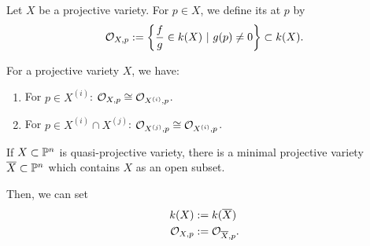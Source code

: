 \begin{definition}
	Let $X$ be a projective variety. For $p \in X$, we define its  at $p$ by
	\[ \O_{X,p} := \set{\frac{f}{g} \in k(X)}{g(p) \neq 0}\subset k(X). \]
\end{definition}
\begin{lemma}
	For a projective variety $X$, we have:
	\begin{enumerate}
		\item For $p \in X^{(i)}$: $\O_{X,p} \isom{} \O_{X^{(i)},p}$.
		\item For $p \in X^{(i)}\cap X^{(j)}$: $\O_{X^{(j)},p} \isom{} \O_{X^{(i)},p}$.
	\end{enumerate}
\end{lemma}

\begin{definition}
	If $X\subset \P^n$ is quasi-projective variety, there is a minimal projective variety $\overline{X}\subset \P^n$ which contains $X$ as an open subset.
	
	Then, we can set
	\begin{align*}
	k(X) &:= k(\overline{X})\\
	\O_{X,p} &:= \O_{\overline{X},p}.
	\end{align*}
\end{definition}